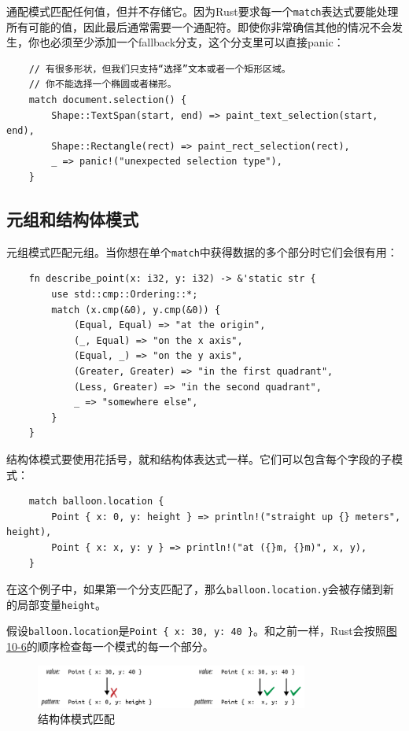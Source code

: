 通配模式匹配任何值，但并不存储它。因为Rust要求每一个\texttt{match}表达式要能处理所有可能的值，因此最后通常需要一个通配符。即使你非常确信其他的情况不会发生，你也必须至少添加一个fallback分支，这个分支里可以直接panic：
\begin{verbatim}
    // 有很多形状，但我们只支持“选择”文本或者一个矩形区域。
    // 你不能选择一个椭圆或者梯形。
    match document.selection() {
        Shape::TextSpan(start, end) => paint_text_selection(start, end),
        Shape::Rectangle(rect) => paint_rect_selection(rect),
        _ => panic!("unexpected selection type"),
    }
\end{verbatim}

\subsection{元组和结构体模式}
元组模式匹配元组。当你想在单个\texttt{match}中获得数据的多个部分时它们会很有用：
\begin{verbatim}
    fn describe_point(x: i32, y: i32) -> &'static str {
        use std::cmp::Ordering::*;
        match (x.cmp(&0), y.cmp(&0)) {
            (Equal, Equal) => "at the origin",
            (_, Equal) => "on the x axis",
            (Equal, _) => "on the y axis",
            (Greater, Greater) => "in the first quadrant",
            (Less, Greater) => "in the second quadrant",
            _ => "somewhere else",
        }
    }
\end{verbatim}

结构体模式要使用花括号，就和结构体表达式一样。它们可以包含每个字段的子模式：
\begin{verbatim}
    match balloon.location {
        Point { x: 0, y: height } => println!("straight up {} meters", height),
        Point { x: x, y: y } => println!("at ({}m, {}m)", x, y),
    }
\end{verbatim}

在这个例子中，如果第一个分支匹配了，那么\texttt{balloon.location.y}会被存储到新的局部变量\texttt{height}。

假设\texttt{balloon.location}是\texttt{Point \{ x: 30, y: 40 \}}。和之前一样，Rust会按照\hyperref[f10-6]{图10-6}的顺序检查每一个模式的每一个部分。

\begin{figure}[htbp]
    \centering
    \includegraphics[width=0.8\textwidth]{../img/f10-6.png}
    \caption{结构体模式匹配}
    \label{f10-6}
\end{figure}

